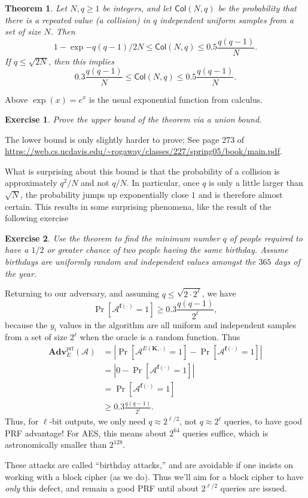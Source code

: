 \documentclass[11pt]{article}
\newtheorem{exercise}{Exercise}
\newtheorem{theorem}{Theorem}
\newcommand{\calA}{\mathcal{A}}
\newcommand{\Adv}{\mathbf{Adv}}
\newcommand{\AdvPRF}[2]{\Adv^{\mathrm{prf}}_{#1}({#2})}
\newcommand{\bK}{\mathbf{K}}
\newcommand{\bof}{\mathbf{f}}
\newcommand{\Col}{\mathsf{Col}}
\begin{document}
\begin{theorem}
    Let $N,q\geq 1$ be integers, and let $\Col(N,q)$ be the probability that
    there is a repeated value (a \emph{collision}) in $q$ independent uniform
    samples from a set of size $N$. Then
    \[
        1 - \exp{-q(q-1)/2N} \leq \Col(N,q) \leq 0.5\frac{q(q-1)}{N}.
    \]
    If $q\leq \sqrt{2N}$, then this implies
    \[
        0.3 \frac{q(q-1)}{N} \leq \Col(N,q) \leq 0.5\frac{q(q-1)}{N}.
    \]
\end{theorem}
Above $\exp(x)=e^x$ is the usual exponential function from calculus.
\begin{exercise}
    Prove the upper bound of the theorem via a union bound.
\end{exercise}
The lower bound is only slightly harder to prove; See page 273 of
\url{https://web.cs.ucdavis.edu/~rogaway/classes/227/spring05/book/main.pdf}.

What is surprising about this bound is that the probability of a collision
is approximately $q^2/N$ and not $q/N$. In particular, once $q$ is only
a little larger than $\sqrt{N}$, the probability jumps up exponentially close
$1$ and is therefore almost certain. This results in some surprising
phenomena, like the result of the following exercise
\begin{exercise}
    Use the theorem to find the minimum number $q$ of people required to have
    a $1/2$ or greater chance of two people having the same birthday. Assume
    birthdays are uniformly random and independent values amongst the
    $365$ days of the year.
\end{exercise}

Returning to our adversary, and assuming $q\leq \sqrt{2\cdot 2^\ell}$, we
have
\[
    \Pr[\calA^{\bof(\cdot)}=1] \geq 0.3 \frac{q(q-1)}{2^\ell},
\]
because the $y_i$ values in the algorithm are all uniform and independent
samples from a set of size $2^\ell$ when the oracle is a random function. 
Thus
\begin{align*}
    \AdvPRF{E}{\calA} 
    & = \left|\Pr[\calA^{E(\bK,\cdot)}=1]-\Pr[\calA^{\bof(\cdot)}=1]\right| \\
    & = \left|0-\Pr[\calA^{\bof(\cdot)}=1]\right| \\
    & = \Pr[\calA^{\bof(\cdot)}=1] \\
    & \geq  0.3 \frac{q(q-1)}{2^\ell}.
\end{align*}
Thus, for $\ell$-bit outputs, we only need $q\approx 2^{\ell/2}$, not
$q\approx 2^{\ell}$ queries, to have good PRF advantage! For AES, this
means about $2^{64}$ queries suffice, which is astronomically smaller
than $2^{128}$.

These attacks are called ``birthday attacks,'' and are avoidable if one
insists on working with a block cipher (as we do). Thus we'll aim for
a block cipher to have \emph{only} this defect, and remain a good PRF
until about $2^{\ell/2}$ queries are issued.
\end{document}
